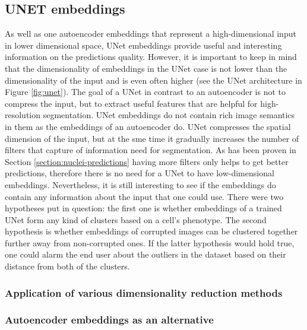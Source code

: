 \subsection{UNET embeddings}
    \label{section:unet-embeddings-study}
    As well as one autoencoder embeddings that represent a high-dimensional input in lower dimensional space, UNet embeddings provide useful and interesting information on the predictions quality. However, it is important to keep in mind that the dimensionality of embeddings in the UNet case is not lower than the dimensionality of the input and is even often higher (see the UNet architecture in Figure \ref{fig:unet}). The goal of a UNet in contrast to an autoencoder is not to compress the input, but to extract useful features that are helpful for high-resolution segmentation. UNet embeddings do not contain rich image semantics in them as the embeddings of an autoencoder do. UNet compresses the spatial dimension of the input, but at the sme time it gradually increases the number of filters that capture of information need for segmentation. As has been proven in Section \ref{section:nuclei-predictions} having more filters only helps to get better predictions, therefore there is no need for a UNet to have low-dimensional embeddings. Nevertheless, it is still interesting to see if the embeddings do contain any information about the input that one could use. There were two hypotheses put in question: the first one is whether embeddings of a trained UNet form any kind of clusters based on a cell's phenotype. The second hypothesis is whether embeddings of corrupted images can be clustered together further away from non-corrupted ones. If the latter hypothesis would hold true, one could alarm the end user about the outliers in the dataset based on their distance from both of the clusters. 
    \subsubsection{Application of various dimensionality reduction methods}
        \label{section:unet-embeddings-dim-reduction}
        
    \subsubsection{Autoencoder embeddings as an alternative}
        